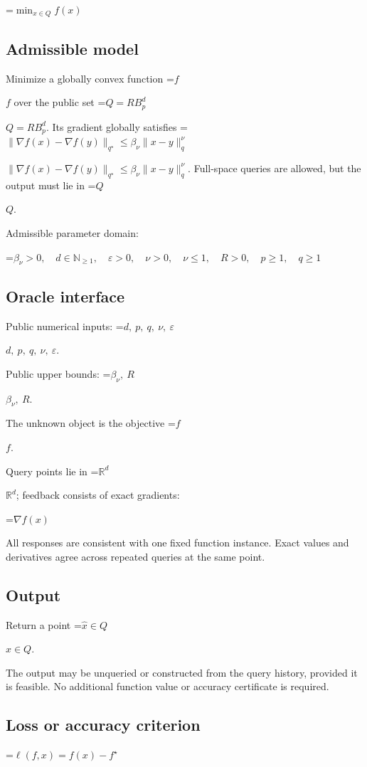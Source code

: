\documentclass[10pt,a4paper]{article}
\newcommand{\AtlasMath}[1]{\par\begingroup\centering\setbox0=\hbox{$\displaystyle #1$}\ifdim\wd0>1.4\linewidth\typeout{ATLAS WIDE FORMULA: \the\wd0}\fi\ifdim\wd0>\linewidth\resizebox{\linewidth}{!}{\box0}\else\box0\fi\par\endgroup}
\newcommand{\AtlasInlineMath}[1]{\begingroup\setbox0=\hbox{$#1$}\ifdim\wd0>.4\linewidth\endgroup\AtlasMath{#1}\else\endgroup$#1$\fi}
\begin{document}
\AtlasMath{\min_{x\in Q}f(x)}


\subsection{Admissible model}
Minimize a globally convex function \AtlasInlineMath{f} over the public set \AtlasInlineMath{Q=RB_p^d}. Its gradient globally satisfies \AtlasInlineMath{\|\nabla f(x)-\nabla f(y)\|_{q^\star}\le\beta_\nu\|x-y\|_q^\nu}. Full-space queries are allowed, but the output must lie in \AtlasInlineMath{Q}.

Admissible parameter domain:


\AtlasMath{\beta_\nu>0,\quad d\in\mathbb{N}_{\ge1},\quad \varepsilon>0,\quad \nu>0,\quad \nu\le1,\quad R>0,\quad p\ge1,\quad q\ge1}


\subsection{Oracle interface}
Public numerical inputs: \AtlasInlineMath{d,\ p,\ q,\ \nu,\ \varepsilon}.

Public upper bounds: \AtlasInlineMath{\beta_\nu,\ R}.

The unknown object is the objective \AtlasInlineMath{f}.

Query points lie in \AtlasInlineMath{\mathbb{R}^d}; feedback consists of exact gradients:


\AtlasMath{\nabla f(x)}


All responses are consistent with one fixed function instance. Exact values and derivatives agree across repeated queries at the same point.

\subsection{Output}
Return a point \AtlasInlineMath{\widehat x\in Q}.

The output may be unqueried or constructed from the query history, provided it is feasible. No additional function value or accuracy certificate is required.

\subsection{Loss or accuracy criterion}

\AtlasMath{\ell(f,x)=f(x)-f^\star}
\end{document}
